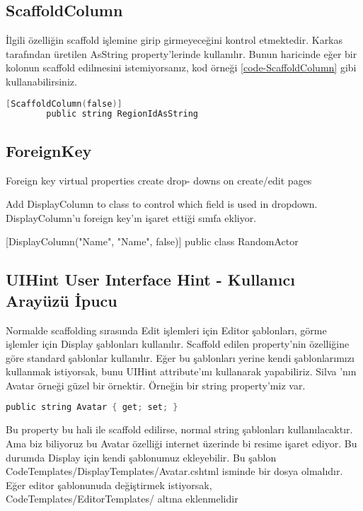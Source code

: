 \documentclass[10pt,a4paper]{article}
\begin{document}
\subsection{ScaffoldColumn }
İlgili özelliğin scaffold işlemine girip girmeyeceğini kontrol etmektedir.
Karkas tarafından üretilen AsString property'lerinde kullanılır.
Bunun haricinde eğer bir kolonun scaffold edilmesini istemiyorsanız,
kod örneği \ref{code-ScaffoldColumn} gibi kullanabilirsiniz.




\begin{lstlisting}[label=code-ScaffoldColumn,caption=ScaffoldColumn,language=C]
		[ScaffoldColumn(false)]
		public string RegionIdAsString
\end{lstlisting}


\subsection{ForeignKey  }


		
Foreign key virtual properties create drop- downs on create/edit pages

Add DisplayColumn to class to control
which field is used in dropdown. DisplayColumn'u foreign key'ın işaret ettiği sınıfa ekliyor.

[DisplayColumn("Name", "Name", false)]
public class RandomActor


\subsection{UIHint User Interface Hint - Kullanıcı Arayüzü İpucu}

Normalde scaffolding sırasında Edit işlemleri için Editor şablonları,
görme işlemler için Display şablonları kullanılır.
Scaffold edilen property'nin özelliğine göre standard şablonlar kullanılır.
Eğer bu şablonları yerine kendi şablonlarımızı kullanmak istiyorsak,
bunu UIHint attribute'ını kullanarak yapabiliriz.
Silva \cite{Silva2010Quick}'nın Avatar örneği güzel bir örnektir.
Örneğin bir string property'miz var.

\begin{lstlisting}[label=code-UIHintOrnek1,caption=UIHint Örnek1,language=C]
	public string Avatar { get; set; }
\end{lstlisting}

Bu property bu hali ile scaffold edilirse, normal string şablonları kullanılacaktır.
Ama biz biliyoruz bu Avatar özelliği internet üzerinde bi resime işaret ediyor.
Bu durumda Display için kendi şablonumuz ekleyebilir.
Bu şablon CodeTemplates/DisplayTemplates/Avatar.cshtml isminde bir dosya olmalıdır.
Eğer editor şablonunuda değiştirmek istiyorsak,  CodeTemplates/EditorTemplates/ altına eklenmelidir
\end{document}
